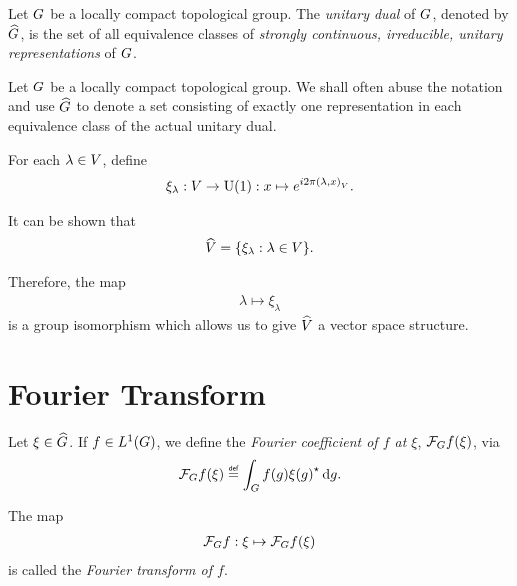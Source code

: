 \begin{definition}
\label{definition:unitary_dual}
    Let $G$ be a locally compact topological group.
    The \emph{unitary dual} of $G$, denoted by ${\widehat{G}}$,
    is the set of all equivalence classes of
    \emph{strongly continuous, irreducible, unitary representations} of $G$.
\end{definition}

\begin{remark}
    Let $G$ be a locally compact topological group.
    We shall often abuse the notation and use ${\widehat{G}}$ to denote a set consisting of
    exactly one representation in each equivalence class of the actual unitary dual.
\end{remark}

\begin{example}[$\dualGroup\VectorSpace$]
    For each $\lambda \in V$,
    define
    \begin{align}
        \xi_\lambda : V \to {\mathrm{U} (1)} : x \mapsto e^{i 2 \pi {\left(\lambda, x\right)_{V}}}.
        \label{eq:elements_of_dual_of_vector_space}
    \end{align}

    It can be shown that
    \begin{align*}
        {\widehat{V}} = \{ \xi_\lambda : \lambda \in V \}.
    \end{align*}

    Therefore, the map
    \begin{align}
        \lambda \mapsto \xi_\lambda
        \label{eq:isomorphism_between_vector_space_and_its_dual_group}
    \end{align}
    is a group isomorphism which allows us to give $\dualGroup\VectorSpace$ a vector space structure.
\end{example}

\section{Fourier Transform}

\begin{definition}
    Let $\xi \in {\widehat{G}}$.
    If $f \in {L^{1} (G)}$,
    we define the \emph{Fourier coefficient of $f$ at $\xi$}, $\mathcal{F}_{G} f(\xi)$, via
    \begin{align*}
        \Fourier f(\xi) \defeq \int_\Group f(g) \adj{\xi(g)} \dd g.
    \end{align*}

    The map
    \begin{align*}
        \mathcal{F}_{G} f : \xi \mapsto \mathcal{F}_{G} f(\xi)
    \end{align*}
    is called the \emph{Fourier transform of $f$}.
\end{definition}

